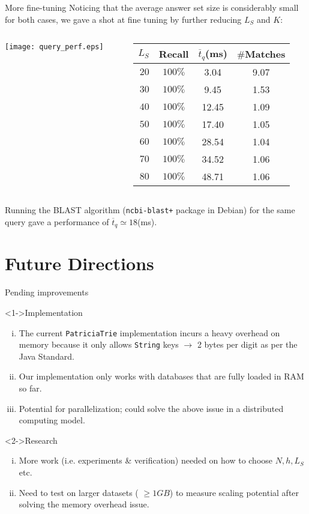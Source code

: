 \documentclass[9pt]{beamer}
\begin{document}
\begin{frame}{More fine-tuning}
	Noticing that the average answer set size is considerably small for both cases, we gave a shot at fine tuning by further reducing $L_S$ and $K$: 
	\begin{columns}
	\begin{column}{0.5 \textwidth}
		\centering
		\texttt{[image: query\_perf.eps]}
	\end{column}
	\begin{column}{0.5 \textwidth}
		\centering
		\begin{tabular}{r | c c c}
			$L_S$ & Recall & $\overline{t}_q$(ms) & $\#$Matches \\ \hline
			$ 20 $  & $100\%$ & 3.04 & 9.07 \\
			$ 30 $  & $100\%$ & 9.45 & 1.53 \\
			$ 40 $  & $100\%$ & 12.45 & 1.09 \\
			$ 50 $  & $100\%$ & 17.40 & 1.05 \\
			$ 60 $  & $100\%$ & 28.54 & 1.04 \\
			$ 70 $  & $100\%$ & 34.52 & 1.06 \\
			$ 80 $  & $100\%$ & 48.71 & 1.06
		\end{tabular}
	\end{column}
	\end{columns}
	Running the BLAST algorithm (\texttt{ncbi-blast+} package in Debian) for the same query gave a performance of $\overline{t}_q \simeq 18$(ms).
\end{frame}
\section{Future Directions}
\begin{frame}{Pending improvements}
	\begin{block}<1->{Implementation}
		\begin{enumerate}[(i)]
			\item The current \texttt{PatriciaTrie} implementation incurs a heavy overhead on memory because it only allows \texttt{String} keys $ \to $ 2 bytes per digit as per the Java Standard.
			\item Our implementation only works with databases that are fully loaded in RAM so far.
			\item Potential for parallelization; could solve the above issue in a distributed computing model.
		\end{enumerate}
	\end{block}
	\begin{block}<2->{Research}
		\begin{enumerate}[(i)]
			\item More work (i.e. experiments \& verification) needed on how to choose $N, h, L_S$ etc.
			\item Need to test on larger datasets ( $ \geq 1 GB $) to measure scaling potential after solving the memory overhead issue.
		\end{enumerate}
	\end{block}
\end{frame}
\end{document}
